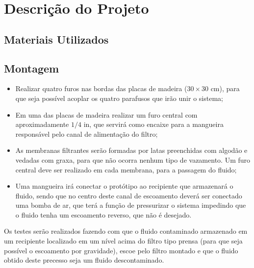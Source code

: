 \chapter{Descrição do Projeto}\label{descricao}

\section{Materiais Utilizados}

\section{Montagem}
\label{sec:montagem}

\begin{itemize}
\item Realizar quatro furos nas bordas das placas de madeira ($30\times30$ \si{cm}),
  para que seja possível acoplar os quatro parafusos que irão unir o sistema;
\item Em uma das placas de madeira realizar um furo central com aproximadamente
  $1/4$ \si{in}, que servirá como encaixe para a mangueira responsável pelo canal de
  alimentação do filtro;
\item As membranas filtrantes serão formadas por latas preenchidas com algodão e
  vedadas com graxa, para que não ocorra nenhum tipo de vazamento. Um furo
  central deve ser realizado em cada membrana, para a passagem do fluido;
\item Uma mangueira irá conectar o protótipo ao recipiente que armazenará o
  fluido, sendo que no centro deste canal de escoamento deverá ser conectado
  uma bomba de ar, que terá a função de pressurizar o sistema impedindo que o
  fluido tenha um escoamento reverso, que não é desejado.
\end{itemize}

Os testes serão realizados fazendo com que o fluido contaminado armazenado em um
recipiente localizado em um nível acima do filtro tipo prensa (para que seja
possível o escoamento por gravidade), escoe pelo filtro montado e que o fluido
obtido deste precesso seja um fluido descontaminado.

